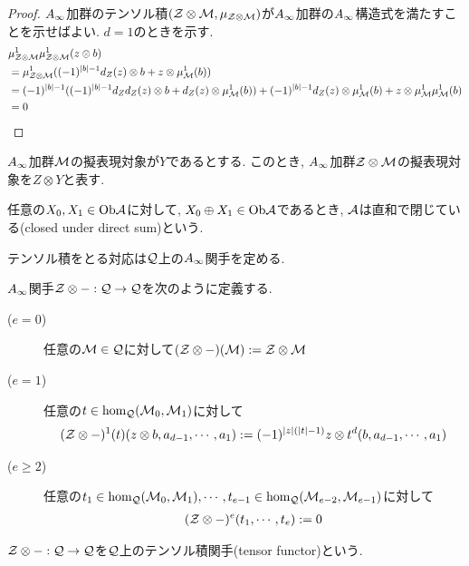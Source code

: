 \documentclass[uplatex, a4paper, 14Q, dvipdfmx]{jsarticle}
\begin{document}
\begin{proof}
  $A_{\infty}$加群のテンソル積$(\mathcal{Z} \otimes \mathcal{M}, \mu_{\mathcal{Z} \otimes \mathcal{M}})$が$A_{\infty}$加群の$A_{\infty}$構造式を満たすことを示せばよい. 
  $d=1$のときを示す.
  \begin{align*}
    &\mu^1_{\mathcal{Z} \otimes \mathcal{M}} \mu^1_{\mathcal{Z} \otimes \mathcal{M}}(z \otimes b) \\
    &= \mu^1_{\mathcal{Z} \otimes \mathcal{M}} ((-1)^{|b|-1} d_Z(z) \otimes b + z \otimes \mu^1_{\mathcal{M}}(b)) \\
    &= (-1)^{|b|-1} ((-1)^{|b|-1} d_Z d_Z (z) \otimes b + d_Z(z) \otimes \mu^1_{\mathcal{M}}(b)) + (-1)^{|b|-1} d_Z(z) \otimes \mu^1_{\mathcal{M}}(b) + z \otimes \mu^1_{\mathcal{M}} \mu^1_{\mathcal{M}}(b) \\
    &= 0 
  \end{align*}
\end{proof}

\begin{notation}
  $A_{\infty}$加群$\mathcal{M}$の擬表現対象が$Y$であるとする. 
  このとき, $A_{\infty}$加群$\mathcal{Z} \otimes \mathcal{M}$の擬表現対象を$Z \otimes Y$と表す. 
\end{notation}

\begin{definition}[直和で閉じている]
  任意の$X_0,X_1 \in \mathrm{Ob}\mathcal{A}$に対して, $X_0 \oplus X_1 \in \mathrm{Ob}\mathcal{A}$であるとき, $\mathcal{A}$は直和で閉じている(closed under direct sum)という. 
\end{definition}

テンソル積をとる対応は$\Q$上の$A_{\infty}$関手を定める.

\begin{definition}[$\Q$上のテンソル積関手] \label{def_tensor_functor}
  $A_{\infty}$関手$\mathcal{Z} \otimes - : \mathcal{Q} \to \mathcal{Q}$を次のように定義する.
  \begin{description}
    \item[($e=0$)] 任意の$\mathcal{M} \in \mathcal{Q}$に対して$(\mathcal{Z} \otimes -)(\mathcal{M}) := \mathcal{Z} \otimes \mathcal{M}$
    \item[($e=1$)] 任意の$t \in \hom_{\mathcal{Q}}(\mathcal{M}_0,\mathcal{M}_1)$に対して
    \begin{align*}
      (\mathcal{Z} \otimes -)^1(t)(z \otimes b,a_{d-1},\cdots,a_1) 
      := (-1)^{|z|(|t|-1)} z \otimes t^d(b,a_{d-1},\cdots,a_1)
    \end{align*}
    \item[($e \geq 2$)] 任意の$t_1 \in \hom_{\mathcal{Q}}(\mathcal{M}_0,\mathcal{M}_1),\cdots,t_{e-1} \in \hom_{\mathcal{Q}}(\mathcal{M}_{e-2},\mathcal{M}_{e-1})$に対して
    \begin{align*}
      (\mathcal{Z} \otimes -)^e(t_1,\cdots,t_e) := 0
    \end{align*}
  \end{description}
  $\mathcal{Z} \otimes - : \mathcal{Q} \to \mathcal{Q}$を$\Q$上のテンソル積関手(tensor functor)という.
\end{definition}
\end{document}
